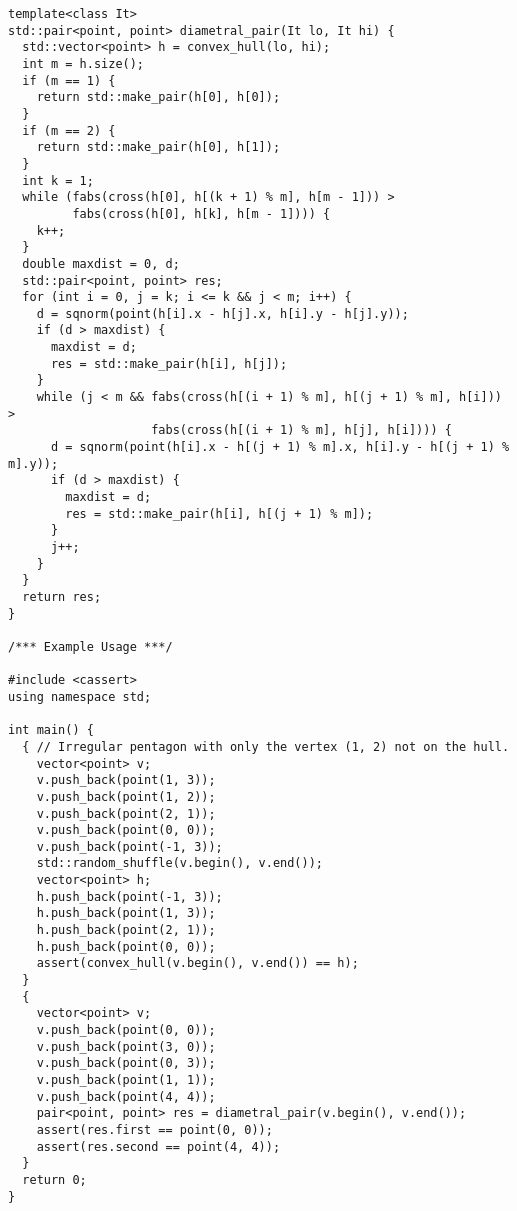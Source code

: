 \begin{lstlisting}
template<class It>
std::pair<point, point> diametral_pair(It lo, It hi) {
  std::vector<point> h = convex_hull(lo, hi);
  int m = h.size();
  if (m == 1) {
    return std::make_pair(h[0], h[0]);
  }
  if (m == 2) {
    return std::make_pair(h[0], h[1]);
  }
  int k = 1;
  while (fabs(cross(h[0], h[(k + 1) % m], h[m - 1])) >
         fabs(cross(h[0], h[k], h[m - 1]))) {
    k++;
  }
  double maxdist = 0, d;
  std::pair<point, point> res;
  for (int i = 0, j = k; i <= k && j < m; i++) {
    d = sqnorm(point(h[i].x - h[j].x, h[i].y - h[j].y));
    if (d > maxdist) {
      maxdist = d;
      res = std::make_pair(h[i], h[j]);
    }
    while (j < m && fabs(cross(h[(i + 1) % m], h[(j + 1) % m], h[i])) >
                    fabs(cross(h[(i + 1) % m], h[j], h[i]))) {
      d = sqnorm(point(h[i].x - h[(j + 1) % m].x, h[i].y - h[(j + 1) % m].y));
      if (d > maxdist) {
        maxdist = d;
        res = std::make_pair(h[i], h[(j + 1) % m]);
      }
      j++;
    }
  }
  return res;
}

/*** Example Usage ***/

#include <cassert>
using namespace std;

int main() {
  { // Irregular pentagon with only the vertex (1, 2) not on the hull.
    vector<point> v;
    v.push_back(point(1, 3));
    v.push_back(point(1, 2));
    v.push_back(point(2, 1));
    v.push_back(point(0, 0));
    v.push_back(point(-1, 3));
    std::random_shuffle(v.begin(), v.end());
    vector<point> h;
    h.push_back(point(-1, 3));
    h.push_back(point(1, 3));
    h.push_back(point(2, 1));
    h.push_back(point(0, 0));
    assert(convex_hull(v.begin(), v.end()) == h);
  }
  {
    vector<point> v;
    v.push_back(point(0, 0));
    v.push_back(point(3, 0));
    v.push_back(point(0, 3));
    v.push_back(point(1, 1));
    v.push_back(point(4, 4));
    pair<point, point> res = diametral_pair(v.begin(), v.end());
    assert(res.first == point(0, 0));
    assert(res.second == point(4, 4));
  }
  return 0;
}
\end{lstlisting}
